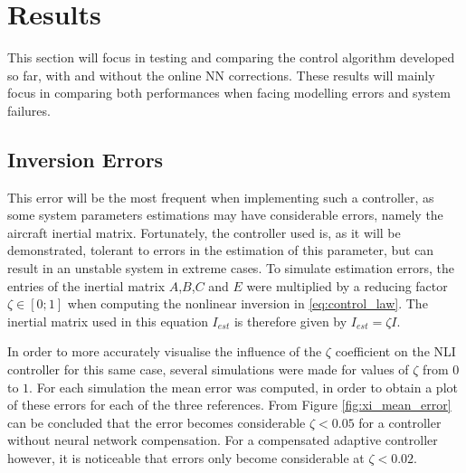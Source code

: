
\section{Results}
\label{sec:resul}

This section will focus in testing and comparing the control algorithm developed so far, with and without the online NN corrections. These results will mainly focus in comparing both performances when facing modelling errors and system failures.


\subsection{Inversion Errors}

This error will be the most frequent when implementing such a controller, as some system parameters estimations may have considerable errors, namely the aircraft inertial matrix. Fortunately, the controller used is, as it will be demonstrated, tolerant to errors in the estimation of this parameter, but can result in an unstable system in extreme cases. To simulate estimation errors, the entries of the inertial matrix $A$,$B$,$C$ and $E$ were multiplied by a reducing factor $\zeta \in [0;1]$ when computing the nonlinear inversion in \ref{eq:control_law}. The inertial matrix used in this equation $I_{est}$ is therefore given by $I_{est} = \zeta I$.

In order to more accurately visualise the influence of the $\zeta$ coefficient on the NLI controller for this same case, several simulations were made for values of $\zeta$ from $0$ to $1$. For each simulation the mean error was computed, in order to obtain a plot of these errors for each of the three references. From Figure \ref{fig:xi_mean_error} can be concluded that the error becomes considerable $\zeta<0.05$ for a controller without neural network compensation. For a compensated adaptive controller however, it is noticeable that errors only become considerable at $\zeta<0.02$.

